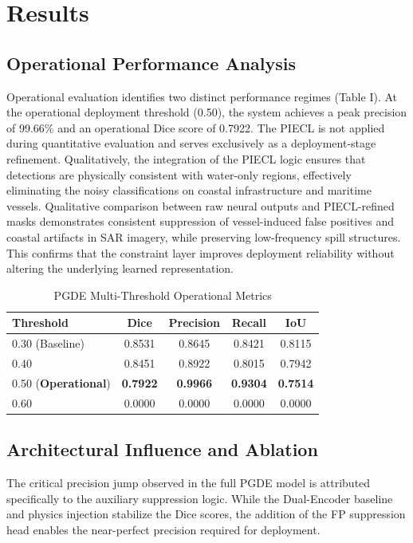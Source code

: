 \section{Results}
\subsection{Operational Performance Analysis}
Operational evaluation identifies two distinct performance regimes (Table I). At the operational deployment threshold (0.50), the system achieves a peak precision of 99.66\% and an operational Dice score of 0.7922. The PIECL is not applied during quantitative evaluation and serves exclusively as a deployment-stage refinement. Qualitatively, the integration of the PIECL logic ensures that detections are physically consistent with water-only regions, effectively eliminating the noisy classifications on coastal infrastructure and maritime vessels. Qualitative comparison between raw neural outputs and PIECL-refined masks demonstrates consistent suppression of vessel-induced false positives and coastal artifacts in SAR imagery, while preserving low-frequency spill structures. This confirms that the constraint layer improves deployment reliability without altering the underlying learned representation.

\begin{table}[ht]
\caption{PGDE Multi-Threshold Operational Metrics}
\centering
\begin{tabular}{lcccc}
\toprule
Threshold & Dice & Precision & Recall & IoU \\
\midrule
0.30 (Baseline) & 0.8531 & 0.8645 & 0.8421 & 0.8115 \\
0.40 & 0.8451 & 0.8922 & 0.8015 & 0.7942 \\
0.50 (\textbf{Operational}) & \textbf{0.7922} & \textbf{0.9966} & \textbf{0.9304} & \textbf{0.7514} \\
0.60 & 0.0000 & 0.0000 & 0.0000 & 0.0000 \\
\bottomrule
\end{tabular}
\end{table}

\subsection{Architectural Influence and Ablation}
The critical precision jump observed in the full PGDE model is attributed specifically to the auxiliary suppression logic. While the Dual-Encoder baseline and physics injection stabilize the Dice scores, the addition of the FP suppression head enables the near-perfect precision required for deployment.

